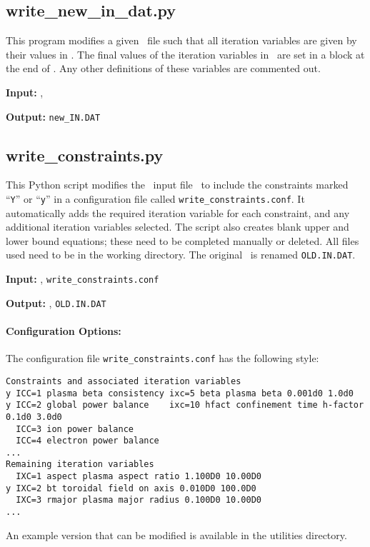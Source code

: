 \subsection{write\_new\_in\_dat.py}

This program modifies a given \indat\ file such that all iteration variables
are given by their values in \outdat. The final values of the iteration
variables in \outdat\ are set in a block at the end of \indat. Any other
definitions of these variables are commented out.

\begin{description}
\item{\textbf{Input:}}
\indat, \outdat\ 
                                
\item{\textbf{Output:}}
\texttt{new\_IN.DAT}
\end{description}

\subsection{write\_constraints.py}

This Python script modifies the \process\ input file \indat\ to include the
constraints marked ``\texttt{Y}'' or ``\texttt{y}'' in a configuration file
called \texttt{write\_constraints.conf}. It automatically adds the required
iteration variable for each constraint, and any additional iteration variables
selected. The script also creates blank upper and lower bound equations; these
need to be completed manually or deleted. All files used need to be in the
working directory. The original \indat\ is renamed \texttt{OLD.IN.DAT}.

\begin{description}
\item{\textbf{Input:}}
\indat, \texttt{write\_constraints.conf}
                                
\item{\textbf{Output:}}
\indat, \texttt{OLD.IN.DAT}
\end{description}

\paragraph{Configuration Options:}

The configuration file \texttt{write\_constraints.conf} has the following style:
\begin{framed}
\begin{verbatim}
Constraints and associated iteration variables
y ICC=1 plasma beta consistency ixc=5 beta plasma beta 0.001d0 1.0d0
y ICC=2 global power balance    ixc=10 hfact confinement time h-factor 0.1d0 3.0d0
  ICC=3 ion power balance                                            
  ICC=4 electron power balance 
...
Remaining iteration variables
  IXC=1 aspect plasma aspect ratio 1.100D0 10.00D0
y IXC=2 bt toroidal field on axis 0.010D0 100.0D0
  IXC=3 rmajor plasma major radius 0.100D0 10.00D0
...
\end{verbatim}
\end{framed}
An example version that can be modified is available in the utilities directory.

